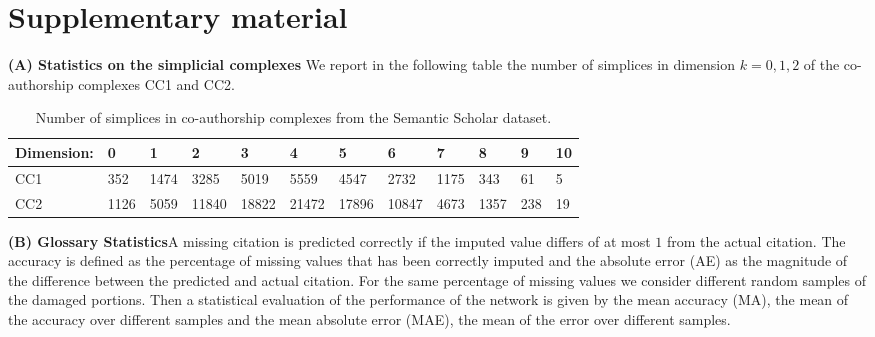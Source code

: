 \section{Supplementary material}\label{sec:supp_material}


\textbf{(A) Statistics on the simplicial complexes}
We report in the following table the number of simplices in dimension $k=0,1,2$ of the co-authorship complexes CC1 and CC2.
\begin{table}[htbp]
  \centering
  \scriptsize{
  \begin{tabular}{llllllllllll}
    \cmidrule(r){1-12}
    Dimension:   & 0     & 1  & 2     & 3 & 4     & 5 & 6    & 7 & 8   & 9 & 10\\
    \midrule
    CC1 & 352  & 1474  & 3285  & 5019  & 5559  & 4547  & 2732  & 1175  & 343 & 61 & 5\\
    CC2 & 1126 & 5059 & 11840 & 18822 & 21472 & 17896  & 10847 & 4673 & 1357 & 238 & 19\\ 
    \bottomrule
  \end{tabular}}
  \vspace{2pt}
  \caption{%
  Number of simplices in co-authorship complexes from the Semantic Scholar dataset.
  } \label{table:Simplices-coauthor}
\end{table}

\textbf{(B) Glossary Statistics}A missing citation is predicted correctly if the imputed value differs of at most $1$ from the actual citation. The accuracy is defined as the percentage of missing values that has been correctly imputed and the absolute error (AE) as the magnitude of the difference between the predicted and actual citation. For the same percentage of missing values we consider different random samples of the damaged portions. Then a statistical evaluation of the performance of the network is given by the mean accuracy (MA), the mean of the accuracy over different samples and the mean absolute error (MAE), the mean of the error over different samples.
